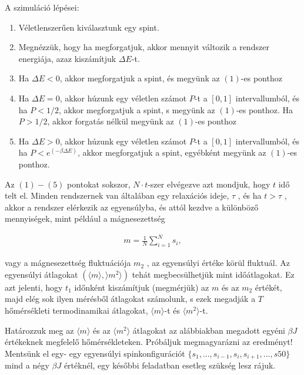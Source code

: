 \documentclass[a4paper, 12pt]{article}
\numberwithin{equation}{section}          %
\numberwithin{figure}{subsection}
\begin{document}
\newpage
A szimuláció lépései:

\begin{enumerate}
	\item Véletlenszerűen kiválasztunk egy spint.
	\item Megnézzük, hogy ha megforgatjuk, akkor mennyit változik a rendszer energiája, azaz kiszámítjuk $\Delta E$-t.
	\item Ha $\Delta E < 0$, akkor megforgatjuk a spint, és megyünk az $(1)$-es ponthoz
	\item Ha $\Delta E = 0$, akkor húzunk egy véletlen számot $P$-t a $[0, 1]$ intervallumból, és ha $P < 1/2$, akkor megforgatjuk a spint, s megyünk az $(1)$-es ponthoz. Ha $P > 1/2$, akkor forgatás
	nélkül megyünk az $(1)$-es ponthoz
	\item Ha $\Delta E > 0$, akkor húzunk egy véletlen számot $P$-t a $[0, 1]$ intervallumból, és ha $P <
	e^(-\beta \Delta E)$, akkor megforgatjuk a spint, egyébként megyünk az $(1)$-es ponthoz.
\end{enumerate}

Az $(1)-(5)$ pontokat sokszor, $N \cdot t$-szer elvégezve azt mondjuk, hogy $t$ idő telt el. Minden
rendszernek van általában egy relaxációs ideje, $\tau$ , és ha $t > \tau $ , akkor a rendszer elérkezik az
egyensúlyba, és attól kezdve a különböző mennyiségek, mint például a mágnesezettség

\begin{center}
	\begin{gather}
		m = \frac{1}{N} \sum_{i = 1}^{N}s_i,
	\end{gather}
\end{center}

vagy a mágnesezettség fluktuációja $m_2$ , az egyensúlyi értéke körül fluktuál. Az egyensúlyi
átlagokat $(\langle m \rangle, \rangle m^2 \rangle)$ tehát megbecsülhetjük mint időátlagokat. Ez azt jelenti, hogy $t_1$
időnként kiszámítjuk (megmérjük) az $m$ és az $m_2$ értékét, majd elég sok ilyen mérésből
átlagokat számolunk, s ezek megadják a $T$ hőmérsékleti termodinamikai átlagokat, $\langle m \rangle$-t és
$\langle m^2 \rangle$-t.
\newline

Határozzuk meg az $\langle m \rangle$ és az $\langle m^2 \rangle$ átlagokat az alábbiakban megadott egyéni $\beta J$ értékeknek megfelelő hőmérsékleteken. Próbáljuk megmagyarázni az eredményt! Mentsünk el egy-
egy egyensúlyi spinkonfigurációt $\{s_1 , ..., s _{i-1} , s_i , s_{i+1} , ..., s 50 \}$ mind a négy $\beta J$ értéknél, egy
későbbi feladatban esetleg szükség lesz rájuk.
\end{document}
